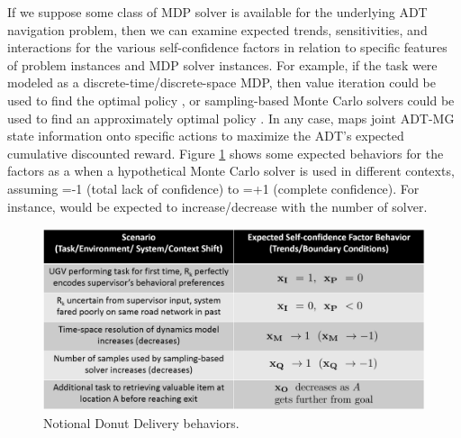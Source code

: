 If we suppose some class of MDP solver is available for the underlying ADT navigation problem, then we can examine expected trends, sensitivities, and interactions for the various self-confidence factors in relation to specific features of problem instances and MDP solver instances. 
For example, if the task were modeled  as a discrete-time/discrete-space MDP, then value iteration could be used to find the optimal policy \policyopt, or sampling-based Monte Carlo solvers could be used to find an approximately optimal policy \policy{}  \cite{Browne2012-fo}. In any case, \policy{} maps joint ADT-MG state information onto specific actions to maximize the ADT's expected cumulative discounted reward. 
Figure \ref{fig:trendsBCs} shows some expected behaviors for the \famsec{} factors as a when a hypothetical Monte Carlo solver is used in different contexts, assuming \flow{}=-1 (total lack of confidence) to \fup{}=+1 (complete confidence). For instance, \xQ{} would be expected to increase/decrease with the number of solver. %
\begin{figure}[tbp]
    \centering
    \includegraphics[width=0.65\linewidth]{Figures/scTrendsBoundaryExample_2generic.png}
    \caption{ Notional Donut Delivery \famsec{} behaviors.}
    \label{fig:trendsBCs}
    \vspace{-0.5 cm}
\end{figure}


